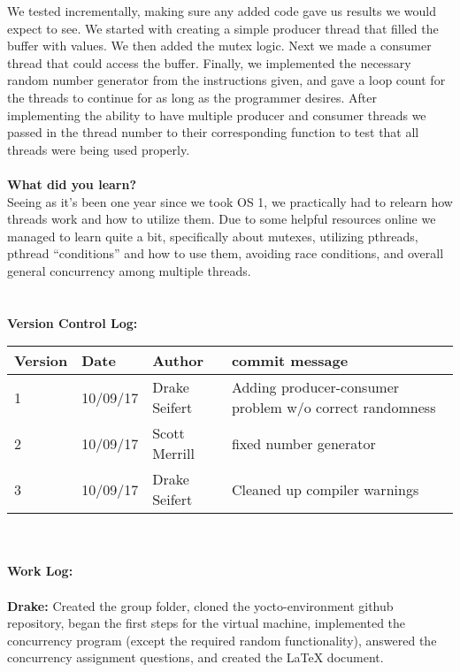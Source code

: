 \documentclass[10pt]{article}
\begin{document}
We tested incrementally, making sure any added code gave us results we would expect to see. We started with creating a simple producer thread that filled the buffer with values. We then added the mutex logic. Next we made a consumer thread that could access the buffer. Finally, we implemented the necessary random number generator from the instructions given, and gave a loop count for the threads to continue for as long as the programmer desires. After implementing the ability to have multiple producer and consumer threads we passed in the thread number to their corresponding function to test that all threads were being used properly.\\\\
\textbf{What did you learn?}\\

Seeing as it’s been one year since we took OS 1, we practically had to relearn how threads work and how to utilize them. Due to some helpful resources online we managed to learn quite a bit, specifically about mutexes, utilizing pthreads, pthread “conditions” and how to use them, avoiding race conditions, and overall general concurrency among multiple threads.\\\\\\
\textbf{Version Control Log:}\\
\begin{center}
	\begin{tabular}{| l | l | l | p{5cm} |}
	\hline
	Version & Date & Author & commit message \\ \hline
	1 & 10/09/17 & Drake Seifert & Adding producer-consumer problem w/o correct randomness \\ \hline
	2 & 10/09/17 & Scott Merrill & fixed number generator \\ \hline
	3 & 10/09/17 & Drake Seifert & Cleaned up compiler warnings \\ \hline
	\end{tabular}
\end{center}
\textbf{\\\\Work Log:}\\\\
\textbf{Drake: }Created the group folder, cloned the yocto-environment github repository, began the first steps for the virtual machine, implemented the concurrency program (except the required random functionality), answered the concurrency assignment questions, and created the LaTeX document.\\
\end{document}

